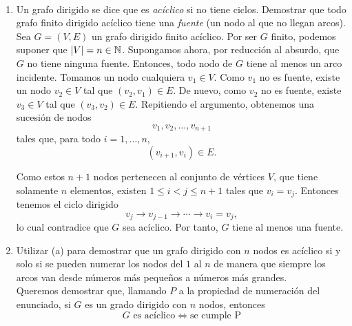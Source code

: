 \begin{ejercicio}~
    \begin{enumerate}
        \item[(a)] Un grafo dirigido se dice que es \textit{acíclico} si no tiene ciclos. Demostrar que todo grafo finito dirigido acíclico tiene 
        una \textit{fuente} (un nodo al que no llegan arcos). \\

            Sea $G=(V,E)$ un grafo dirigido finito acíclico. Por ser $G$ finito, podemos suponer que $|V| = n \in \mathbb{N}$. Supongamos ahora, 
            por reducción al absurdo, que $G$ no tiene ninguna fuente. Entonces, todo nodo de $G$ tiene al menos un arco incidente. Tomamos un nodo cualquiera $v_1 \in V$. Como $v_1$ no es fuente, 
            existe un nodo $v_2 \in V$ tal que $(v_2,v_1)\in E$. De nuevo, como $v_2$ no es fuente, existe $v_3 \in V$ tal que $(v_3,v_2)\in E$. 
            Repitiendo el argumento, obtenemos una sucesión de nodos $$v_1,v_2,\dots,v_{n+1}$$
            tales que, para todo $i=1,\dots,n$,
            $$
            (v_{i+1},v_i)\in E.
            $$

            Como estos $n+1$ nodos pertenecen al conjunto de vértices $V$, que tiene solamente $n$ elementos, existen $1\leq i<j\leq n+1$ tales que 
            $v_i=v_j$. Entonces tenemos el ciclo dirigido
            $$
            v_j \to v_{j-1}\to \cdots \to v_i=v_j,
            $$
            lo cual contradice que $G$ sea acíclico. Por tanto, $G$ tiene al menos una fuente.

        \item[(b)] Utilizar (a) para demostrar que un grafo dirigido con $n$ nodos es acíclico si y solo si se pueden numerar los nodos del $1$ al $n$ 
        de manera que siempre los arcos van desde números más pequeños a números más grandes. \\

            Queremos demostrar que, llamando $P$ a la propiedad de numeración del enunciado, si $G$ es un grado dirigido con $n$ nodos, entonces $$G \text{ es acíclico} \iff \text{se cumple P}$$
            

\end{enumerate}
\end{ejercicio}
